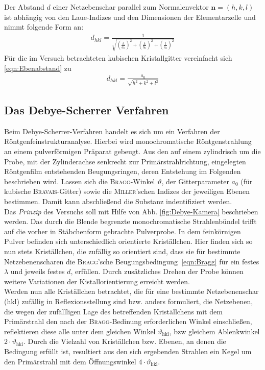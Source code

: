 \documentclass[a4paper,twoside,final]{article}
\begin{document}
Der Abstand $d$ einer Netzebenschar parallel zum Normalenvektor $\bm{n}=(h,k,l)$ ist abhängig von den Laue-Indizes und den Dimensionen der Elementarzelle und nimmt folgende Form an:
\begin{align}
  d_{hkl} = \frac{1}{\sqrt{\left(\frac{h}{a_0}\right)^2+\left(\frac{k}{b_0}\right)^2+\left(\frac{l}{c_0}\right)^2}}\label{eqn:Ebenabstand}
\end{align}
Für die im Versuch betrachteten kubischen Kristallgitter vereinfacht sich \eqref{eqn:Ebenabstand} zu
\begin{align}
  d_{hkl} = \frac{a_0}{\sqrt{h^2+k^2+l^2}}\label{eqn:Abstand_kubisch}
\end{align}

\subsection{Das Debye-Scherrer Verfahren}\label{sec:Verfahren}
Beim Debye-Scherrer-Verfahren handelt es sich um ein Verfahren der Röntgenfeinstrukturanalyse. Hierbei wird monochromatische Röntgenstrahlung an einem pulverförmigen Präparat gebeugt. Aus den auf einem zylindrisch um die Probe, mit der Zylinderachse senkrecht zur Primärstrahlrichtung, eingelegten Röntgenfilm entstehenden Beugungsringen, deren Entstehung im Folgenden beschrieben wird. Lassen sich die \textsc{Bragg}-Winkel $\vartheta$, der Gitterparameter $a_0$ (für kubische \textsc{Bravais}-Gitter) sowie die \textsc{Miller}'schen Indizes der jeweiligen Ebenen bestimmen. Damit kann abschließend die Substanz indentifiziert werden.\\
Das \textit{Prinzip} des Versuchs soll mit Hilfe von Abb. \ref{fig:Debye-Kamera} beschrieben werden. Das durch die Blende begrenzte monochromatische Strahlenbündel trifft auf die vorher in Stäbchenform gebrachte Pulverprobe. In dem feinkörnigen Pulver befinden sich unterschiedlich orientierte Kriställchen. Hier finden sich so nun stets Kriställchen, die zufällig so orientiert sind, dass sie für bestimmte Netzebenenscharen die \textsc{Bragg}'sche Beugungsbedingung~\eqref{eqn:Bragg} für ein festes $\lambda$ und jeweils festes $d$, erfüllen. Durch zusätzliches Drehen der Probe können weitere Variationen der Kistallorientierung erreicht werden.\\
Werden nun alle Kriställchen betrachtet, die für eine bestimmte Netzebenenschar (hkl) zufällig in Reflexionsstellung sind bzw. anders formuliert, die Netzebenen, die wegen der zufällligen Lage des betreffenden Kriställchens mit dem Primärstrahl den nach der \textsc{Bragg}-Bedinung erforderlichen Winkel einschließen, reflektieren diese alle unter dem gleichen Winkel $\vartheta_\text{hkl}$, bzw gleichem Ablenkwinkel $2\cdot\vartheta_\text{hkl}$. Durch die Vielzahl von Kriställchen bzw. Ebenen, an denen die Bedingung erfüllt ist, resultiert aus den sich ergebenden Strahlen ein Kegel um den Primärstrahl mit dem Öffnungswinkel $4\cdot\vartheta_\text{hkl}$. \\
\end{document}
